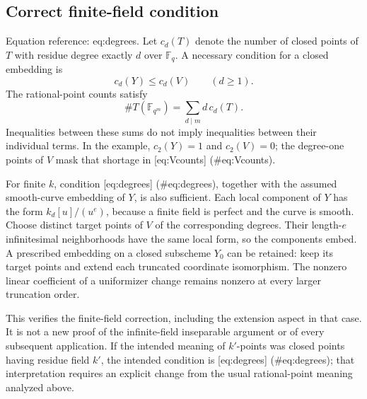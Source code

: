 \documentclass[10pt]{article}
\begin{document}
\subsection*{Correct finite-field condition}
Equation reference: eq:degrees. Let \(c_d(T)\) denote the number of closed points of \(T\) with residue degree exactly \(d\) over \(\mathbb F_q\). A necessary condition for a closed embedding is \[
 c_d(Y)\le c_d(V)\qquad(d\ge1).\] The rational-point counts satisfy \[\#T(\mathbb F_{q^m})=\sum_{d\mid m}d\,c_d(T).\] Inequalities between these sums do not imply inequalities between their individual terms. In the example, \(c_2(Y)=1\) and \(c_2(V)=0\); the degree-one points of \(V\) mask that shortage in [eq:Vcounts] (\#eq:Vcounts).\par
For finite \(k\), condition [eq:degrees] (\#eq:degrees), together with the assumed smooth-curve embedding of \(Y\), is also sufficient. Each local component of \(Y\) has the form \(k_d[u]/(u^e)\), because a finite field is perfect and the curve is smooth. Choose distinct target points of \(V\) of the corresponding degrees. Their length-\(e\) infinitesimal neighborhoods have the same local form, so the components embed. A prescribed embedding on a closed subscheme \(Y_0\) can be retained: keep its target points and extend each truncated coordinate isomorphism. The nonzero linear coefficient of a uniformizer change remains nonzero at every larger truncation order.\par
This verifies the finite-field correction, including the extension aspect in that case. It is not a new proof of the infinite-field inseparable argument or of every subsequent application. If the intended meaning of \(k'\)-points was closed points having residue field \(k'\), the intended condition is [eq:degrees] (\#eq:degrees); that interpretation requires an explicit change from the usual rational-point meaning analyzed above.\par
\end{document}
